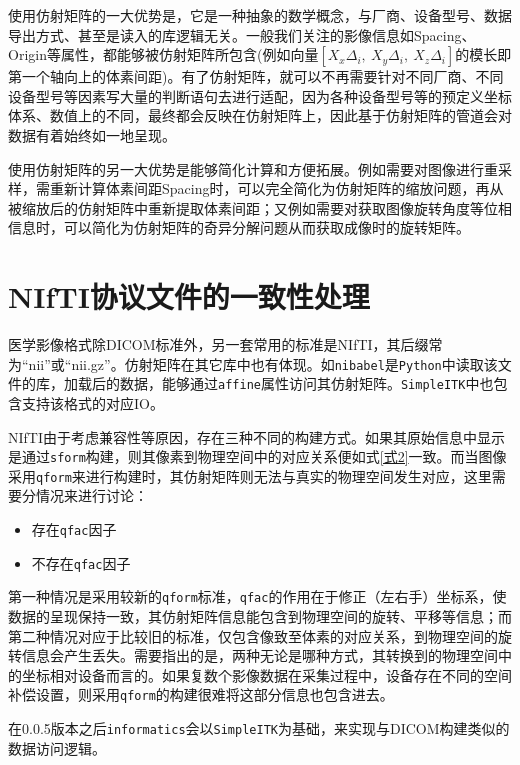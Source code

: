 \documentclass{ctexart}
\begin{document}
使用仿射矩阵的一大优势是，它是一种抽象的数学概念，与厂商、设备型号、数据导出方式、甚至是读入的库逻辑无关。一般我们关注的影像信息如Spacing、Origin等属性，都能够被仿射矩阵所包含(例如向量$[X_x\Delta_i,\ X_y\Delta_i,\ X_z\Delta_i]$的模长即第一个轴向上的体素间距)。有了仿射矩阵，就可以不再需要针对不同厂商、不同设备型号等因素写大量的判断语句去进行适配，因为各种设备型号等的预定义坐标体系、数值上的不同，最终都会反映在仿射矩阵上，因此基于仿射矩阵的管道会对数据有着始终如一地呈现。\par

使用仿射矩阵的另一大优势是能够简化计算和方便拓展。例如需要对图像进行重采样，需重新计算体素间距Spacing时，可以完全简化为仿射矩阵的缩放问题，再从被缩放后的仿射矩阵中重新提取体素间距；又例如需要对获取图像旋转角度等位相信息时，可以简化为仿射矩阵的奇异分解问题从而获取成像时的旋转矩阵。\par


\section{NIfTI协议文件的一致性处理}

医学影像格式除DICOM标准外，另一套常用的标准是NIfTI，其后缀常为“nii”或“nii.gz”。仿射矩阵在其它库中也有体现。如\verb|nibabel|是\verb|Python|中读取该文件的库，加载后的数据，能够通过\verb|affine|属性访问其仿射矩阵。\verb|SimpleITK|中也包含支持该格式的对应IO。\par

NIfTI由于考虑兼容性等原因，存在三种不同的构建方式。如果其原始信息中显示是通过\verb|sform|构建，则其像素到物理空间中的对应关系便如式\ref{式2}一致。而当图像采用\verb|qform|来进行构建时，其仿射矩阵则无法与真实的物理空间发生对应，这里需要分情况来进行讨论：\par

\begin{itemize}
    \item 存在\verb|qfac|因子
    \item 不存在\verb|qfac|因子
\end{itemize}

第一种情况是采用较新的\verb|qform|标准，\verb|qfac|的作用在于修正（左右手）坐标系，使数据的呈现保持一致，其仿射矩阵信息能包含到物理空间的旋转、平移等信息；而第二种情况对应于比较旧的标准，仅包含像致至体素的对应关系，到物理空间的旋转信息会产生丢失。需要指出的是，两种无论是哪种方式，其转换到的物理空间中的坐标相对设备而言的。如果复数个影像数据在采集过程中，设备存在不同的空间补偿设置，则采用\verb|qform|的构建很难将这部分信息也包含进去。\par

在0.0.5版本之后\verb|informatics|会以\verb|SimpleITK|为基础，来实现与DICOM构建类似的数据访问逻辑。\par
\end{document}
